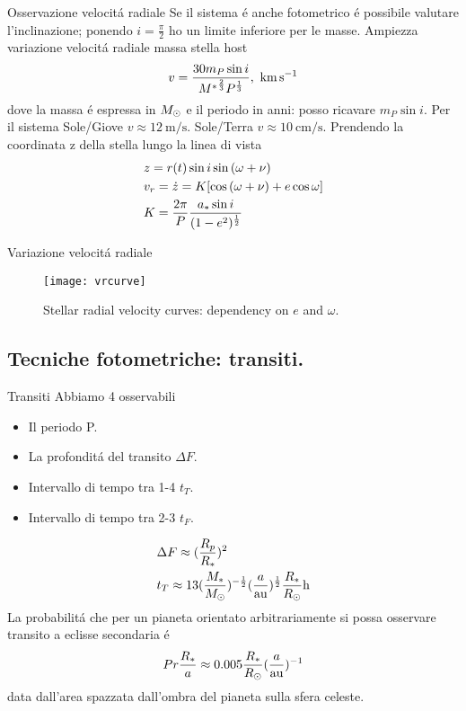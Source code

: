 \begin{wordonframe}{Osservazione velocit\'a radiale}
Se il sistema \'e anche fotometrico \'e possibile valutare l'inclinazione; ponendo $i=\frac{\pi}{2}$ ho un limite inferiore per le masse.
Ampiezza variazione velocit\'a radiale massa stella host
\begin{equation*}
v=\frac{30m_P\sin{i}}{{M^*}\expy{\frac{2}{3}}P\expy{\frac{1}{3}}},\ \si{\kilo\meter\per\second}
\end{equation*}
dove la massa \'e espressa in $M_{\odot}{}$ e il periodo in anni: posso ricavare $m_P\sin{i}$.
Per il sistema Sole/Giove $v\approx\SI{12}{\meter\per\second}$.
Sole/Terra $v\approx\SI{10}{\cm\per\second}$.
Prendendo la coordinata z della stella lungo la linea di vista
\begin{align*}
&z=r(t)\sin{i}\sin{(\omega+\nu)}\\
&v_r=\dot{z}=K[\cos{(\omega+\nu)}+e\cos{\omega}]\\
&K=\frac{2\pi}{P}\frac{a_*\sin{i}}{(1-e^2)^{\frac{1}{2}}}
\end{align*}
\end{wordonframe}

\begin{wordonframe}{Variazione velocit\'a radiale}
\begin{figure}[!ht]
\centering
\texttt{[image: vrcurve]}
\caption{Stellar radial velocity curves: dependency on $e$ and $\omega$.}
\end{figure}
\end{wordonframe}

\subsection{Tecniche fotometriche: transiti.}

\begin{frame}{Transiti}
Abbiamo 4 osservabili
\begin{itemize}
    \item Il periodo P.
    \item La profondit\'a del transito $\Delta F$.
    \item Intervallo di tempo tra 1-4 $t_T$.
    \item Intervallo di tempo tra 2-3 $t_F$.
\end{itemize}
\begin{align*}
&\Delta F\approx(\frac{R_p}{R_*})^2\\
&t_T\approx13(\frac{M_*}{\msun{}})\expy{-\frac{1}{2}}(\frac{a}{\si{\astronomicalunit}})\expy{\frac{1}{2}}\frac{R_*}{\rsun{}}\si{\hour}
\end{align*}
La probabilit\'a che per un pianeta orientato arbitrariamente si possa osservare transito a eclisse secondaria \'e
\begin{equation*}
Pr\frac{R_*}{a}\approx0.005\frac{R_*}{\rsun{}}(\frac{a}{\si{\astronomicalunit}})\expy{-1}
\end{equation*}
data dall'area spazzata dall'ombra del pianeta sulla sfera celeste.
\end{frame}

